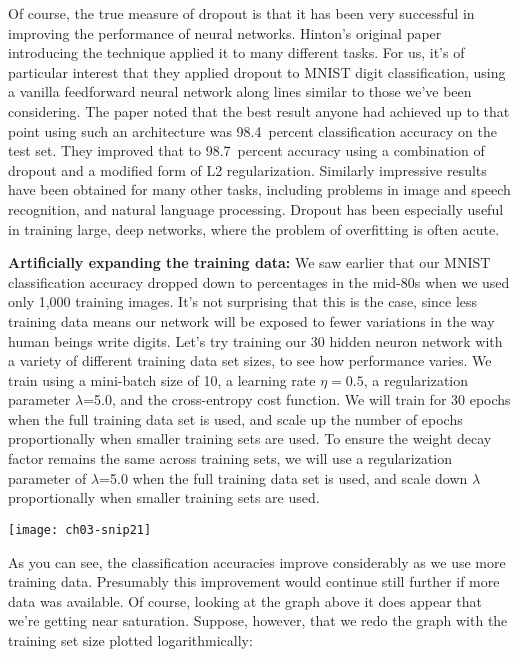 Of course, the true measure of dropout is that it has been very successful in improving the performance of neural networks. Hinton's original paper \cite{HintonSrivastava2012}
introducing the technique applied it to many different tasks. For us, it's of particular interest that they applied dropout to MNIST digit classification, using a vanilla feedforward neural network along lines similar to those we've been considering. The paper noted that the best result anyone had achieved up to that point using such an architecture was 98.4~percent classification accuracy on the test set. They improved that to 98.7~percent accuracy using a combination of dropout and a modified form of L2 regularization. Similarly impressive results have been obtained for many other tasks, including problems in image and speech recognition, and natural language processing. Dropout has been especially useful in training large, deep networks, where the problem of overfitting is often acute.

\textbf{Artificially expanding the training data:} We saw earlier that our MNIST classification accuracy dropped down to percentages in the mid-80s when we used only 1,000 training images. It's not surprising that this is the case, since less training data means our network will be exposed to fewer variations in the way human beings write digits. Let's try training our 30 hidden neuron network with a variety of different training data set sizes, to see how performance varies. We train using a mini-batch size of 10, a learning rate $\eta=0.5$, a regularization parameter $\lambda$=5.0, and the cross-entropy cost function. We will train for 30 epochs when the full training data set is used, and scale up the number of epochs proportionally when smaller training sets are used. To ensure the weight decay factor remains the same across training sets, we will use a regularization parameter of $\lambda$=5.0 when the full training data set is used, and scale down $\lambda$ proportionally when smaller training sets are used.

\begin{marginfigure}
\texttt{[image: ch03-snip21]}
\end{marginfigure}


As you can see, the classification accuracies improve considerably as we use more training data. Presumably this improvement would continue still further if more data was available. Of course, looking at the graph above it does appear that we're getting near saturation. Suppose, however, that we redo the graph with the training set size plotted logarithmically:

